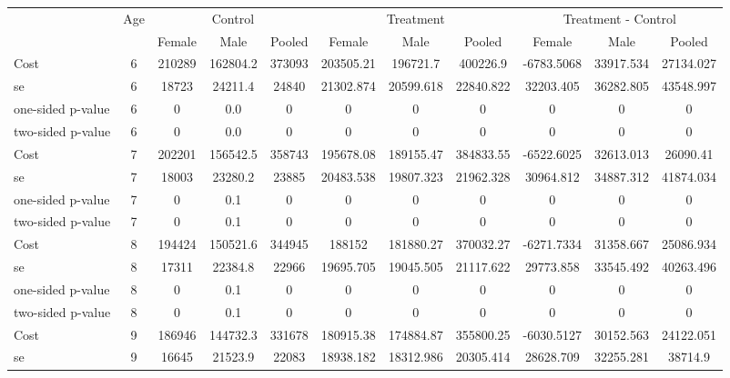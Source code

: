 
\begin{tabular}{lcccccccccc} \hline \hline
 &Age & \multicolumn{3}{c}{Control} & \multicolumn{3}{c}{Treatment} & \multicolumn{3}{c}{Treatment - Control} \\ 
& & Female  & Male  & Pooled  & Female  & Male  & Pooled  & Female  & Male  & Pooled  \\  \hline 
Cost 			  &              6 &    210289 &  162804.2 &    373093 & 203505.21 & 196721.7 & 400226.9 & -6783.5068 & 33917.534 & 27134.027 \\  
se 				 &               6 &     18723 &   24211.4 &     24840 & 21302.874 & 20599.618 & 22840.822 & 32203.405 & 36282.805 & 43548.997 \\  
one-sided p-value&               6 &         0 &       0.0 &         0 & 0 & 0 & 0 & 0 & 0 & 0 \\  
two-sided p-value&               6 &         0 &       0.0 &         0 & 0 & 0 & 0 & 0 & 0 & 0 \\  
Cost 			  &              7 &    202201 &  156542.5 &    358743 & 195678.08 & 189155.47 & 384833.55 & -6522.6025 & 32613.013 & 26090.41 \\  
se 				 &               7 &     18003 &   23280.2 &     23885 & 20483.538 & 19807.323 & 21962.328 & 30964.812 & 34887.312 & 41874.034 \\  
one-sided p-value&               7 &         0 &       0.1 &         0 & 0 & 0 & 0 & 0 & 0 & 0 \\  
two-sided p-value&               7 &         0 &       0.1 &         0 & 0 & 0 & 0 & 0 & 0 & 0 \\  
Cost 			  &              8 &    194424 &  150521.6 &    344945 & 188152 & 181880.27 & 370032.27 & -6271.7334 & 31358.667 & 25086.934 \\  
se 				 &               8 &     17311 &   22384.8 &     22966 & 19695.705 & 19045.505 & 21117.622 & 29773.858 & 33545.492 & 40263.496 \\  
one-sided p-value&               8 &         0 &       0.1 &         0 & 0 & 0 & 0 & 0 & 0 & 0 \\  
two-sided p-value&               8 &         0 &       0.1 &         0 & 0 & 0 & 0 & 0 & 0 & 0 \\  
Cost 			  &               9 &    186946 &  144732.3 &    331678 & 180915.38 & 174884.87 & 355800.25 & -6030.5127 & 30152.563 & 24122.051 \\  
se 				  &              9 &     16645 &   21523.9 &     22083 & 18938.182 & 18312.986 & 20305.414 & 28628.709 & 32255.281 & 38714.9 \\  

\end{tabular}
